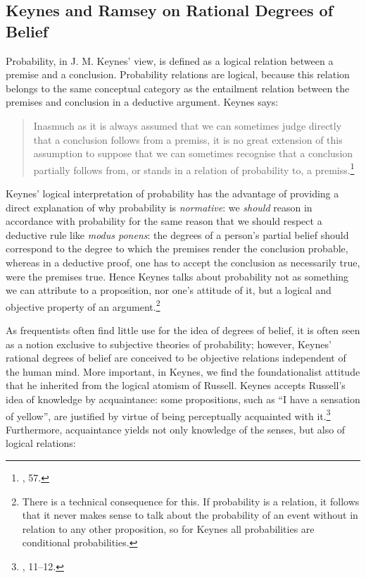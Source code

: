 \hypertarget{rational-degrees-of-belief}{%
\subsection{Keynes and Ramsey on Rational Degrees of
Belief}\label{sec:rational-degrees-of-belief}}

Probability, in J. M. Keynes' view, is defined as a logical relation between
a premise and a conclusion. Probability relations are logical, because
this relation belongs to the same conceptual category as the entailment
relation between the premises and conclusion in a deductive argument.
Keynes says:

\begin{quote}
Inasmuch as it is always assumed that we can sometimes judge directly
that a conclusion follows from a premiss, it is no great extension of
this assumption to suppose that we can sometimes recognise that a
conclusion partially follows from, or stands in a relation of
probability to, a premiss.\footnote{\cite{keynes}, 57.}
\end{quote}

Keynes' logical interpretation of probability has the advantage of
providing a direct explanation of why probability is \emph{normative}:
we \emph{should} reason in accordance with probability for the same reason
that we should respect a deductive rule like \emph{modus ponens}: the
degrees of a person's partial belief should correspond to the degree to
which the premises render the conclusion probable, whereas in a
deductive proof, one has to accept the conclusion as necessarily true,
were the premises true. Hence Keynes talks about probability not as
something we can attribute to a proposition, nor one's attitude of it,
but a logical and objective property of an argument.\footnote{There is a technical
  consequence for this. If probability is a relation, it follows that it
  never makes sense to talk about the probability of an event without in
  relation to any other proposition, so for Keynes all probabilities are
  conditional probabilities.}

As frequentists often find little use for the idea of degrees of belief,
it is often seen as a notion exclusive to subjective theories of
probability; however, Keynes' rational degrees of belief are conceived to
be objective relations independent of the human mind. More important, in Keynes, we find the foundationalist attitude that he
inherited from the logical atomism of Russell. Keynes accepts Russell's
idea of knowledge by acquaintance: some propositions, such as ``I have a
sensation of yellow'', are justified by virtue of being perceptually
acquainted with it.\footnote{\cite{keynes}, 11--12.} Furthermore, acquaintance
yields not only knowledge of the senses, but also of logical relations:


